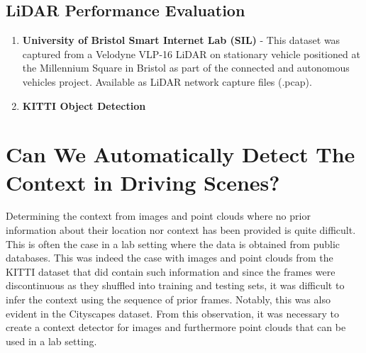 \subsection{LiDAR Performance Evaluation}

\begin{enumerate}
	\item \textbf{University of Bristol Smart Internet Lab (SIL)} - This dataset was captured from a  Velodyne VLP-16 LiDAR on stationary vehicle positioned at the Millennium Square in Bristol as part of the connected and autonomous vehicles project. Available as LiDAR network capture files (.pcap).
	\item \textbf{KITTI Object Detection}
\end{enumerate}

\section{Can We Automatically Detect The  Context in Driving Scenes?}

Determining the context from images and point clouds where no prior information about their location nor context  has been provided is quite difficult. This is often the case in a lab setting where the data is obtained from public databases. This was indeed the case with images and point clouds from the KITTI dataset that did contain such information and since the  frames were discontinuous as they shuffled into training and testing sets, it was difficult to infer the context using the sequence of prior frames. Notably, this was also evident in the Cityscapes dataset. From this observation, it was necessary to create a context detector for images and furthermore point clouds that can be used in a lab setting. 


